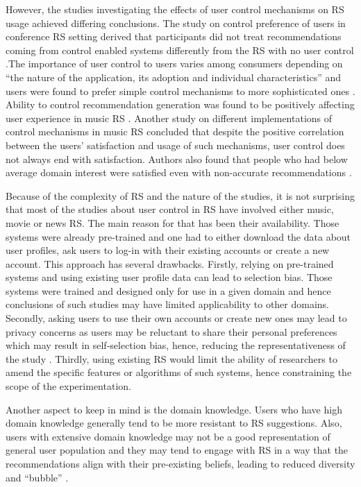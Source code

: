 \documentclass[a4paper,12pt]{article}
\begin{document}
However, the studies investigating the effects of user control mechanisms on RS usage achieved differing conclusions. The study on control preference of users in conference RS setting derived  that participants did not treat recommendations coming from control enabled systems differently from the RS with no user control  \citep{jameson2002pros}.The importance of user control to users varies among consumers depending on ``the nature of the application, its adoption and individual characteristics'' and users were found to prefer simple control mechanisms to more sophisticated ones \citep{knijnenburg2011each, knijnenburgExplainingUserExperience2012}. Ability to control recommendation generation was found to be positively affecting user experience in music RS \citep{bostandjiev2012tasteweights, knijnenburgExplainingUserExperience2012}. Another study on different implementations of control mechanisms in music RS concluded that despite the positive correlation between the users' satisfaction and usage of such mechanisms, user control does not always end with satisfaction. Authors also found that people who had below average domain interest were satisfied even with non-accurate recommendations \citep{hijikataStudyUserIntervention2014}.

Because of the complexity of RS and the nature of the studies, it is not surprising that most of the studies about user control in RS have involved either music, movie or news RS. The main reason for that has been their availability. Those systems were already pre-trained and one had to either download the data about user profiles, ask users to log-in with their existing accounts or create a new account. This approach has several drawbacks. Firstly, relying on pre-trained systems and using existing user profile data can lead to selection bias. Those systems were trained and designed only for use in a given domain and hence conclusions of such studies may have limited applicability to other domains. Secondly, asking users to use their own accounts or create new ones may lead to privacy concerns as users may be reluctant to share their personal preferences which may result in self-selection bias, hence, reducing the representativeness of the study \citep{belanger2011privacy}. Thirdly, using existing RS would limit the ability of researchers to amend the specific features or algorithms of such systems, hence constraining the scope of the experimentation.

Another aspect to keep in mind is the domain knowledge. Users who have high domain knowledge generally tend to be more resistant to RS suggestions. Also, users with extensive domain knowledge may not be a good representation of general user population and they may tend to engage with RS in a way that the recommendations align with their pre-existing beliefs, leading to reduced diversity and ``bubble'' \citep{mollerNotBlameIt2018}.  
\end{document}
